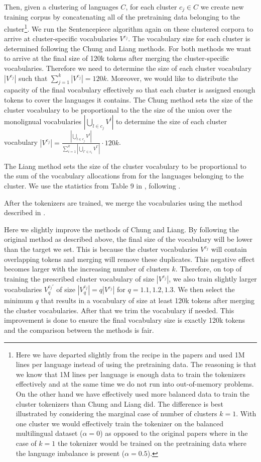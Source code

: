 Then, given a clustering of languages $C$, for each cluster $c_j \in C$ we create new training corpus by concatenating all of the pretraining data belonging to the cluster\footnote{Here we have departed slightly from the recipe in the papers and used 1M lines per language instead of using the pretraining data. The reasoning is that we know that 1M lines per language is enough data to train the tokenizers effectively and at the same time we do not run into out-of-memory problems. On the other hand we have effectively used more balanced data to train the cluster tokenizers than Chung and Liang did. The difference is best illustrated by considering the marginal case of number of clusters $k=1$. With one cluster we would effectively train the tokenizer on the balanced multilingual dataset ($\alpha = 0$) as opposed to the original papers where in the case of $k=1$ the tokenizer would be trained on the pretraining data where the language imbalance is present ($\alpha = 0.5$).}. We run the Sentencepiece algorithm again on these clustered corpora to arrive at cluster-specific vocabularies $V^{c_j}$. The vocabulary size for each cluster is determined following the Chung and Liang methods. For both methods we want to arrive at the final size of 120k tokens after merging the cluster-specific vocabularies. Therefore we need to determine the size of each cluster vocabulary $|V^{c_j}|$ such that $\sum_{j=1}^k |V^{c_j}| = 120k$. Moreover, we would like to distribute the capacity of the final vocabulary effectively so that each cluster is assigned enough tokens to cover the languages it contains. The Chung method sets the size of the cluster vocabulary to be proportional to the the size of the union over the monolignual vocabularies $|\bigcup_{l \in c_j} V^l|$ to determine the size of each cluster vocabulary $|V^{c_j}| = \frac{|\bigcup_{l \in c_j} V^l|}{\sum_{i=1}^k |\bigcup_{l' \in c_i} V^{l'}|} \cdot 120k$.

The Liang method sets the size of the cluster vocabulary to be proportional to the sum of the vocabulary allocations from \citet{zheng_allocating_2021} for the languages belonging to the cluster. We use the statistics from Table 9 in \citet{zheng_allocating_2021}, following \citet{liang_xlm-v_2023}.

After the tokenizers are trained, we merge the vocabularies using the method described in . 

Here we slightly improve the methods of Chung and Liang. By following the original method as described above, the final size of the vocabulary will be lower than the target we set. This is because the cluster vocabularies $V^{c_j}$ will contain overlapping tokens and merging will remove these duplicates. This negative effect becomes larger with the increasing number of clusters $k$. Therefore, on top of training the prescribed cluster vocabulary of size $|V^{c_j}|$, we also train slightly larger vocabularies $V_q^{c_j'}$ of size $|V_q^{c_j}| = q|V^{c_j}|$ for $q = 1.1, 1.2, 1.3$. We then select the minimum $q$ that results in a vocabulary of size at least 120k tokens after merging the cluster vocabularies. After that we trim the vocabulary if needed. This improvement is done to ensure the final vocabulary size is exactly 120k tokens and the comparison between the methods is fair.

